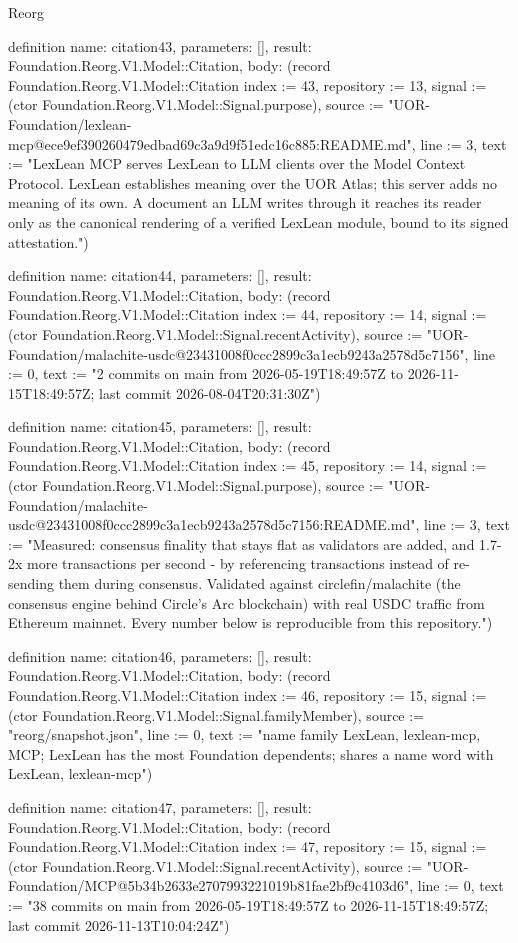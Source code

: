 \begin{lexlean}{Reorg}
\begin{semanticmodule}
definition{
  name: citation43,
  parameters: [],
  result: Foundation.Reorg.V1.Model::Citation,
  body: (record Foundation.Reorg.V1.Model::Citation {index := 43, repository := 13, signal := (ctor Foundation.Reorg.V1.Model::Signal.purpose), source := "UOR-Foundation/lexlean-mcp@ece9ef390260479edbad69c3a9d9f51edc16c885:README.md", line := 3, text := "LexLean MCP serves LexLean to LLM clients over the Model Context Protocol. LexLean establishes meaning over the UOR Atlas; this server adds no meaning of its own. A document an LLM writes through it reaches its reader only as the canonical rendering of a verified LexLean module, bound to its signed attestation."})
}

definition{
  name: citation44,
  parameters: [],
  result: Foundation.Reorg.V1.Model::Citation,
  body: (record Foundation.Reorg.V1.Model::Citation {index := 44, repository := 14, signal := (ctor Foundation.Reorg.V1.Model::Signal.recentActivity), source := "UOR-Foundation/malachite-usdc@23431008f0ccc2899c3a1ecb9243a2578d5c7156", line := 0, text := "2 commits on main from 2026-05-19T18:49:57Z to 2026-11-15T18:49:57Z; last commit 2026-08-04T20:31:30Z"})
}

definition{
  name: citation45,
  parameters: [],
  result: Foundation.Reorg.V1.Model::Citation,
  body: (record Foundation.Reorg.V1.Model::Citation {index := 45, repository := 14, signal := (ctor Foundation.Reorg.V1.Model::Signal.purpose), source := "UOR-Foundation/malachite-usdc@23431008f0ccc2899c3a1ecb9243a2578d5c7156:README.md", line := 3, text := "Measured: consensus finality that stays flat as validators are added, and 1.7-2x more transactions per second - by referencing transactions instead of re-sending them during consensus. Validated against circlefin/malachite (the consensus engine behind Circle's Arc blockchain) with real USDC traffic from Ethereum mainnet. Every number below is reproducible from this repository."})
}

definition{
  name: citation46,
  parameters: [],
  result: Foundation.Reorg.V1.Model::Citation,
  body: (record Foundation.Reorg.V1.Model::Citation {index := 46, repository := 15, signal := (ctor Foundation.Reorg.V1.Model::Signal.familyMember), source := "reorg/snapshot.json", line := 0, text := "name family {LexLean, lexlean-mcp, MCP}; LexLean has the most Foundation dependents; shares a name word with LexLean, lexlean-mcp"})
}

definition{
  name: citation47,
  parameters: [],
  result: Foundation.Reorg.V1.Model::Citation,
  body: (record Foundation.Reorg.V1.Model::Citation {index := 47, repository := 15, signal := (ctor Foundation.Reorg.V1.Model::Signal.recentActivity), source := "UOR-Foundation/MCP@5b34b2633e2707993221019b81fae2bf9c4103d6", line := 0, text := "38 commits on main from 2026-05-19T18:49:57Z to 2026-11-15T18:49:57Z; last commit 2026-11-13T10:04:24Z"})
}


\end{semanticmodule}
\end{lexlean}
